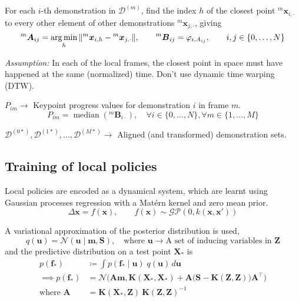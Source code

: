 For each \( i \)-th demonstration in \( \mathcal{D}^{(m)} \), find the index \( h \) of the closest point \( {}^{m}\boldsymbol{x}_{i, \cdot} \) to every other element of other demonstrations \( {}^{m}\boldsymbol{x}_{j, \cdot} \), giving
\begin{equation}
    {}^{m}\boldsymbol{A}_{ij} = \operatorname*{arg\,min}_{h} \Vert {}^{m}\boldsymbol{x}_{i, h} - {}^{m}\boldsymbol{x}_{j, \cdot} \Vert
    , \qquad
    {}^{m}\boldsymbol{B}_{ij} = \varphi_{i, A_{ij}}
    , \qquad
    i, j \in \{ 0, \ldots, N \}
\end{equation}

\textit{Assumption:} In each of the local frames, the closest point in space must have happened at the same (normalized) time.
Don't use dynamic time warping (DTW).

\( P_{im} \to \) Keypoint progress values for demonstration \( i \) in frame \( m \).
\begin{equation}
    P_{im} = \operatorname{median}({}^{m}\boldsymbol{B}_{i\cdot}), \quad \forall i \in \{ 0, \ldots, N \}, \forall m \in \{ 1, \ldots, M \}
\end{equation}

\( \mathcal{D}^{(0*)}, \mathcal{D}^{(1*)}, \ldots, \mathcal{D}^{(M*)} \to \) Aligned (and transformed) demonstration sets.

\subsection{Training of local policies}\label{sec:local-policies}

Local policies are encoded as a dynamical system, which are learnt using Gaussian processes regression with a Mat\'{e}rn kernel and zero mean prior.
\begin{equation}
    \Delta \boldsymbol{x} = f(\boldsymbol{x})
    , \qquad
    f(\boldsymbol{x}) \sim \mathcal{GP}(0, k(\boldsymbol{x}, \boldsymbol{x}'))
\end{equation}

A variational approximation of the posterior distribution is used,
\begin{equation}
    q(\boldsymbol{u}) = \mathcal{N}(\boldsymbol{u} \mid \boldsymbol{m}, \boldsymbol{S}), \quad \text{where } \boldsymbol{u} \to \text{A set of inducing variables in } \boldsymbol{Z}
\end{equation}
and the predictive distribution on a test point \( \boldsymbol{X}_* \) is
\begin{align}
    p(\boldsymbol{f}_*)
     & \coloneq
    \int p(\boldsymbol{f}_* \mid \boldsymbol{u}) \; q(\boldsymbol{u}) \, d\boldsymbol{u}
    \\
    \implies
    p(\boldsymbol{f}_*)
     & =
    \mathcal{N} \Big( \boldsymbol{A} \boldsymbol{m}, \boldsymbol{K}(\boldsymbol{X}_*, \boldsymbol{X}_*) + \boldsymbol{A} \big( \boldsymbol{S} - \boldsymbol{K}(\boldsymbol{Z}, \boldsymbol{Z}) \big) \boldsymbol{A}^\top \Big)
    \\
    \text{where }
    \boldsymbol{A}
     & =
    \boldsymbol{K}(\boldsymbol{X}_*, \boldsymbol{Z}) \ {\boldsymbol{K}(\boldsymbol{Z}, \boldsymbol{Z})}^{-1}
\end{align}

